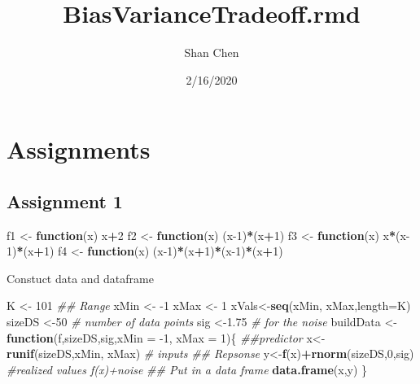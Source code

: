 \documentclass[]{article}
\title{BiasVarianceTradeoff.rmd}
\author{Shan Chen}
\date{2/16/2020}
\newenvironment{Shaded}{\begin{snugshade}}{\end{snugshade}}
\newcommand{\CommentTok}[1]{\textcolor[rgb]{0.56,0.35,0.01}{\textit{#1}}}
\newcommand{\ControlFlowTok}[1]{\textcolor[rgb]{0.13,0.29,0.53}{\textbf{#1}}}
\newcommand{\DataTypeTok}[1]{\textcolor[rgb]{0.13,0.29,0.53}{#1}}
\newcommand{\DecValTok}[1]{\textcolor[rgb]{0.00,0.00,0.81}{#1}}
\newcommand{\FloatTok}[1]{\textcolor[rgb]{0.00,0.00,0.81}{#1}}
\newcommand{\KeywordTok}[1]{\textcolor[rgb]{0.13,0.29,0.53}{\textbf{#1}}}
\newcommand{\NormalTok}[1]{#1}
\newcommand{\OperatorTok}[1]{\textcolor[rgb]{0.81,0.36,0.00}{\textbf{#1}}}
\newcommand{\StringTok}[1]{\textcolor[rgb]{0.31,0.60,0.02}{#1}}
\begin{document}
\maketitle

\hypertarget{assignments}{%
\section{Assignments}\label{assignments}}

\hypertarget{assignment-1}{%
\subsection{Assignment 1}\label{assignment-1}}

\begin{Shaded}
\begin{Highlighting}[]
\NormalTok{f1 <-}\StringTok{ }\ControlFlowTok{function}\NormalTok{(x) x}\OperatorTok{+}\DecValTok{2}
\NormalTok{f2 <-}\StringTok{ }\ControlFlowTok{function}\NormalTok{(x) (x}\DecValTok{-1}\NormalTok{)}\OperatorTok{*}\NormalTok{(x}\OperatorTok{+}\DecValTok{1}\NormalTok{)}
\NormalTok{f3 <-}\StringTok{ }\ControlFlowTok{function}\NormalTok{(x) x}\OperatorTok{*}\NormalTok{(x}\DecValTok{-1}\NormalTok{)}\OperatorTok{*}\NormalTok{(x}\OperatorTok{+}\DecValTok{1}\NormalTok{)}
\NormalTok{f4 <-}\StringTok{ }\ControlFlowTok{function}\NormalTok{(x) (x}\DecValTok{-1}\NormalTok{)}\OperatorTok{*}\NormalTok{(x}\OperatorTok{+}\DecValTok{1}\NormalTok{)}\OperatorTok{*}\NormalTok{(x}\DecValTok{-1}\NormalTok{)}\OperatorTok{*}\NormalTok{(x}\OperatorTok{+}\DecValTok{1}\NormalTok{)}
\end{Highlighting}
\end{Shaded}

Constuct data and dataframe

\begin{Shaded}
\begin{Highlighting}[]
\NormalTok{K <-}\StringTok{ }\DecValTok{101}
\CommentTok{## Range}
\NormalTok{xMin <-}\StringTok{ }\DecValTok{-1}
\NormalTok{xMax <-}\StringTok{ }\DecValTok{1}
\NormalTok{xVals<-}\KeywordTok{seq}\NormalTok{(xMin, xMax,}\DataTypeTok{length=}\NormalTok{K)}
\NormalTok{sizeDS <-}\DecValTok{50} \CommentTok{# number of data points}
\NormalTok{sig <-}\FloatTok{1.75} \CommentTok{# for the noise}
\NormalTok{buildData <-}\StringTok{ }\ControlFlowTok{function}\NormalTok{(f,sizeDS,sig,}\DataTypeTok{xMin =} \DecValTok{-1}\NormalTok{, }\DataTypeTok{xMax =} \DecValTok{1}\NormalTok{)\{}
\CommentTok{##predictor}
\NormalTok{x<-}\KeywordTok{runif}\NormalTok{(sizeDS,xMin, xMax) }\CommentTok{# inputs}
\CommentTok{## Repsonse}
\NormalTok{y<-}\KeywordTok{f}\NormalTok{(x)}\OperatorTok{+}\KeywordTok{rnorm}\NormalTok{(sizeDS,}\DecValTok{0}\NormalTok{,sig) }\CommentTok{#realized values f(x)+noise}
\CommentTok{## Put in a data frame}
\KeywordTok{data.frame}\NormalTok{(x,y)}
\NormalTok{\}}
\end{Highlighting}
\end{Shaded}
\end{document}
